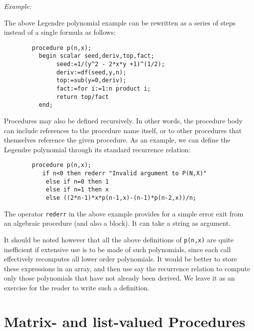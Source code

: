 \textit{Example:}

The above Legendre polynomial example can be rewritten as a series of steps
instead of a single formula as follows:
\begin{verbatim}
        procedure p(n,x);
          begin scalar seed,deriv,top,fact;
               seed:=1/(y^2 - 2*x*y +1)^(1/2);
               deriv:=df(seed,y,n);
               top:=sub(y=0,deriv);
               fact:=for i:=1:n product i;
               return top/fact
          end;
\end{verbatim}
Procedures may also be defined recursively.  In other words, the procedure
body can include references to the procedure name
itself, or to other procedures that themselves reference the given
procedure.  As an example, we can define the Legendre polynomial through
its standard recurrence relation:
\begin{verbatim}
        procedure p(n,x);
           if n<0 then rederr "Invalid argument to P(N,X)"
            else if n=0 then 1
            else if n=1 then x
            else ((2*n-1)*x*p(n-1,x)-(n-1)*p(n-2,x))/n;
\end{verbatim}

\hypertarget{operator:REDERR}{}
The operator \texttt{rederr} in the above example provides
for a simple error exit from an algebraic procedure (and also a block).
It can take a string as argument.

It should be noted however that all the above definitions of \texttt{p(n,x)} are
quite inefficient if extensive use is to be made of such polynomials, since
each call effectively recomputes all lower order polynomials. It would be
better to store these expressions in an array, and then use say the
recurrence relation to compute only those polynomials that have not already
been derived. We leave it as an exercise for the reader to write such a
definition.

\section{Matrix- and list-valued Procedures}
\hypertarget{reserved:MATRIXPROC}{}

